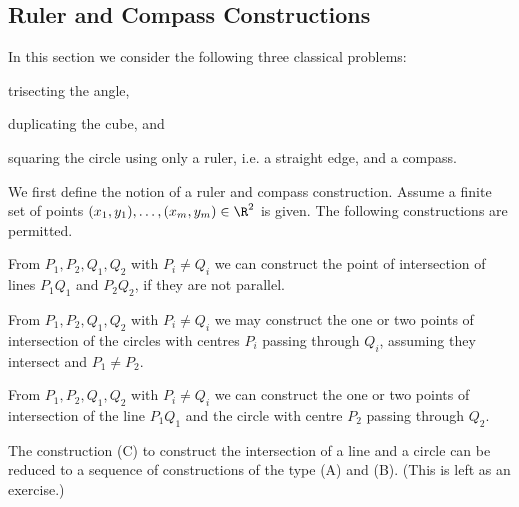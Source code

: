 \subsection{Ruler and Compass Constructions}

In this section we consider the following three classical problems:
\bit
\item trisecting the angle,
\item duplicating the cube, and
\item squaring the circle
\eit
using only a ruler, i.e. a straight edge, and a compass.

We first define the notion of a ruler and compass construction. Assume a finite set of points $(x_1, y_1), \dots , (x_m, y_m) \in \R^2$ is given. The following constructions are permitted.
\ben
\item [(A)] From $P_1, P_2,Q_1,Q_2$ with $P_i \neq Q_i$ we can construct the point of intersection of lines $P_1Q_1$ and $P_2Q_2$, if they are not parallel.
\item [(B)] From $P_1, P_2,Q_1,Q_2$ with $P_i \neq Q_i$ we may construct the one or two points of intersection of the circles with centres $P_i$ passing through $Q_i$, assuming they intersect and $P_1 \neq  P_2$.
\item [(C)] From $P_1, P_2,Q_1,Q_2$ with $P_i \neq Q_i$ we can construct the one or two points of intersection of the line $P_1Q_1$ and the circle with centre $P_2$ passing through $Q_2$.
\een

\begin{remark}
The construction (C) to construct the intersection of a line and a circle can be reduced to a sequence of constructions of the type (A) and (B). (This is left as an exercise.)
\end{remark}

